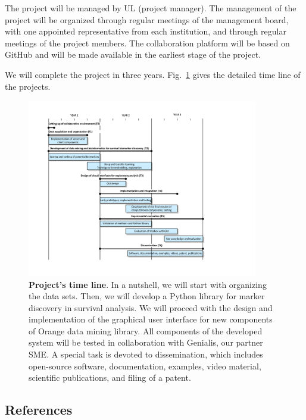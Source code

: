 \documentclass[11pt,a4paper]{article}
\renewcommand{\bold}{\textbf}
\begin{document}
The project will be managed by UL (project manager). The management of the project will be organized through regular meetings of the management board, with one appointed representative from each institution, and through regular meetings of the project members. The collaboration platform will be based on GitHub and will be made available in the earliest stage of the project.

We will complete the project in three years. Fig.~\ref{fig:gantt} gives the detailed time line of the projects.

\begin{figure}
\includegraphics[width=0.90\textwidth]{gantt}
\caption{\bold{Project's time line}. In a nutshell, we will start with organizing the data sets. Then, we will develop a Python library for marker discovery in survival analysis. We will proceed with the design and implementation of the graphical user interface for new components of Orange data mining library. All components of the developed system will be tested in collaboration with Genialis, our partner SME. A special task is devoted to dissemination, which includes open-source software, documentation, examples, video material, scientific publications, and filing of a patent.}
\label{fig:gantt}
\end{figure}



\clearpage
\subsection*{References}


\begin{multicols}{2}
\footnotesize
\setlength{\parskip}{0em}
\renewcommand{\baselinestretch}{1.0}


\end{multicols}
\end{document}
